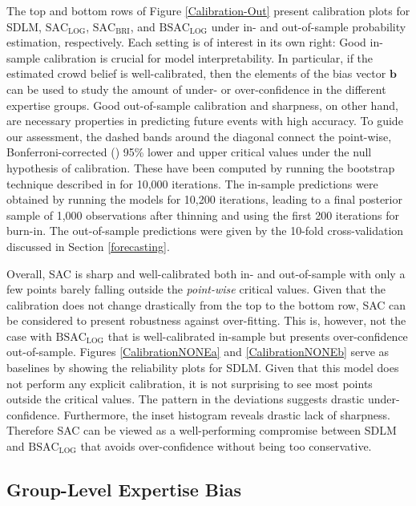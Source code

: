 \documentclass[aoas, preprint]{imsart}
\numberwithin{equation}{section}
\theoremstyle{plain}
\begin{document}
The top and bottom rows of Figure \ref{Calibration-Out} present calibration plots for SDLM, $\text{SAC}_{\text{LOG}}$, $\text{SAC}_{\text{BRI}}$, and $\text{BSAC}_{\text{LOG}}$ under in- and out-of-sample probability estimation, respectively. Each setting is of interest in its own right:  Good in-sample calibration is crucial for model interpretability. In particular, if the estimated crowd belief is well-calibrated, then the elements of the bias vector $\boldsymbol{b}$ can be used to study the amount of under- or over-confidence in the different expertise groups. Good out-of-sample calibration and sharpness, on other hand, are necessary properties in predicting future events with high accuracy.  To guide our assessment, the dashed bands around the diagonal connect the point-wise, Bonferroni-corrected (\citet{bonferroni}) 95\% lower and upper critical values under the null hypothesis of calibration. These have been computed by running the bootstrap technique described in \citet{brocker2007increasing} for 10,000 iterations. The in-sample predictions were obtained by running the models for 10,200 iterations, leading to a final posterior sample of 1,000 observations after thinning and using the first 200 iterations for burn-in. The out-of-sample predictions were given by the 10-fold cross-validation discussed in Section \ref{forecasting}.

Overall, SAC is sharp and well-calibrated both in- and out-of-sample with only a few points barely falling outside the \textit{point-wise} critical values. Given that the calibration does not change drastically from the top to the bottom row, SAC can be considered to present robustness against over-fitting. This is, however, not the case with $\text{BSAC}_{\text{LOG}}$ that is well-calibrated in-sample but presents over-confidence out-of-sample. Figures \ref{CalibrationNONEa} and \ref{CalibrationNONEb} serve as baselines by showing the reliability plots for SDLM. Given that this model does not perform any explicit calibration, it is not surprising to see most points outside the critical values. The pattern in the deviations suggests drastic under-confidence. Furthermore, the inset histogram reveals drastic lack of sharpness. Therefore SAC can be viewed as a well-performing compromise between SDLM and $\text{BSAC}_{\text{LOG}}$ that avoids over-confidence without being too conservative. 
 


\subsection{Group-Level Expertise Bias}
\label{ExpertBias}
\end{document}

